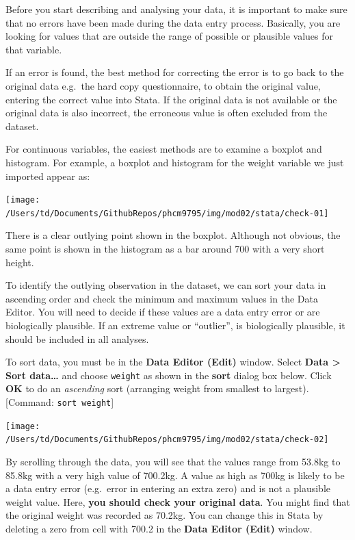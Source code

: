 \documentclass[
]{memoir}
\begin{document}
Before you start describing and analysing your data, it is important to make sure that no errors have been made during the data entry process. Basically, you are looking for values that are outside the range of possible or plausible values for that variable.

If an error is found, the best method for correcting the error is to go back to the original data e.g.~the hard copy questionnaire, to obtain the original value, entering the correct value into Stata. If the original data is not available or the original data is also incorrect, the erroneous value is often excluded from the dataset.

For continuous variables, the easiest methods are to examine a boxplot and histogram. For example, a boxplot and histogram for the weight variable we just imported appear as:

\texttt{[image: /Users/td/Documents/GithubRepos/phcm9795/img/mod02/stata/check-01]}

There is a clear outlying point shown in the boxplot. Although not obvious, the same point is shown in the histogram as a bar around 700 with a very short height.

To identify the outlying observation in the dataset, we can sort your data in ascending order and check the minimum and maximum values in the Data Editor. You will need to decide if these values are a data entry error or are biologically plausible. If an extreme value or ``outlier'', is biologically plausible, it should be included in all analyses.

To sort data, you must be in the \textbf{Data Editor (Edit)} window. Select \textbf{Data \textgreater{} Sort data\ldots{}} and choose \texttt{weight} as shown in the \textbf{sort} dialog box below. Click \textbf{OK} to do an \emph{ascending} sort (arranging weight from smallest to largest). {[}Command: \texttt{sort\ weight}{]}

\texttt{[image: /Users/td/Documents/GithubRepos/phcm9795/img/mod02/stata/check-02]}

By scrolling through the data, you will see that the values range from 53.8kg to 85.8kg with a very high value of 700.2kg. A value as high as 700kg is likely to be a data entry error (e.g.~error in entering an extra zero) and is not a plausible weight value. Here, \textbf{you should check your original data}. You might find that the original weight was recorded as 70.2kg. You can change this in Stata by deleting a zero from cell with 700.2 in the \textbf{Data Editor (Edit)} window.
\end{document}
